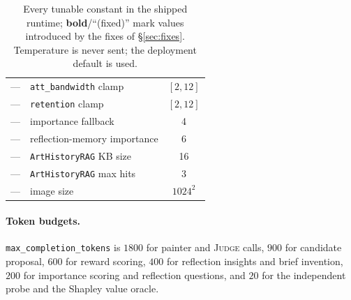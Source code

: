 \documentclass[11pt]{article}
\newcommand{\code}[1]{\texttt{\small #1}}
\newcommand{\JUDGE}{\textsc{Judge}}
\theoremstyle{plain}
\theoremstyle{definition}
\begin{document}
\begin{table}[!ht]
{\begin{tabular}{@{}llc@{}}
---                       & \code{att\_bandwidth} clamp   & $[2,12]$\\
---                       & \code{retention} clamp        & $[2,12]$\\
---                       & importance fallback           & 4\\
---                       & reflection-memory importance  & 6\\
---                       & \code{ArtHistoryRAG} KB size  & 16\\
---                       & \code{ArtHistoryRAG} max hits & 3\\
---                       & image size                    & $1024^2$\\
\bottomrule
\end{tabular}}
\caption{Every tunable constant in the shipped runtime; \textbf{bold}/``(fixed)''
mark values introduced by the fixes of \S\ref{sec:fixes}. Temperature is never
sent; the deployment default is used.}
\end{table}

\paragraph{Token budgets.}
\code{max\_completion\_tokens} is $1800$ for painter and \JUDGE{} calls, $900$
for candidate proposal, $600$ for reward scoring, $400$ for reflection insights
and brief invention, $200$ for importance scoring and reflection questions, and
$20$ for the independent probe and the Shapley value oracle.

\end{document}
